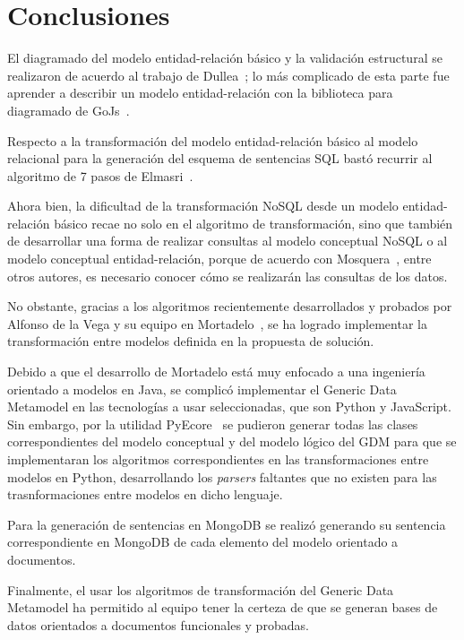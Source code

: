 \section{Conclusiones}


El diagramado del modelo entidad-relación básico y la validación estructural se realizaron de acuerdo al trabajo de Dullea~\cite{dullea_analysis_2003}; lo más complicado de esta parte fue aprender a describir un modelo entidad-relación con la biblioteca para diagramado de GoJs~\cite{noauthor_gojs_nodate-1}.


Respecto a la transformación del modelo entidad-relación básico al modelo relacional para la generación del esquema de sentencias SQL bastó recurrir al algoritmo de 7 pasos de Elmasri~\cite{ramez_elmasri_fundamentos_nodate}.


Ahora bien, la dificultad de la transformación NoSQL desde un modelo entidad-relación básico recae no solo en el algoritmo de transformación, sino que también de desarrollar una forma de realizar consultas al modelo conceptual NoSQL o al modelo conceptual entidad-relación, porque de acuerdo con Mosquera~\cite{martinez-mosquera_modeling_2020}, entre otros autores, es necesario conocer cómo se realizarán las consultas de los datos.



No obstante, gracias a los algoritmos recientemente desarrollados y probados por Alfonso de la Vega y su equipo en Mortadelo~\cite{de_la_vega_mortadelo_2020}, se ha logrado implementar la transformación entre modelos definida en la propuesta de solución.


Debido a que el desarrollo de Mortadelo está muy enfocado a una ingeniería orientado a modelos en Java, se complicó implementar el Generic Data Metamodel en las tecnologías a usar seleccionadas, que son Python y JavaScript. Sin embargo, por la utilidad PyEcore~\cite{pyecore_pyecore_2020} se pudieron generar todas las clases correspondientes del modelo conceptual y del modelo lógico del GDM para que se implementaran los algoritmos correspondientes en las transformaciones entre modelos en Python, desarrollando los \textit{parsers} faltantes que no existen para las trasnformaciones entre modelos en dicho lenguaje.


Para la generación de sentencias en MongoDB se realizó generando su sentencia correspondiente en MongoDB de cada elemento del modelo orientado a documentos.


Finalmente, el usar los algoritmos de transformación del Generic Data Metamodel ha permitido al equipo tener la certeza de que se generan bases de datos orientados a documentos funcionales y probadas.




